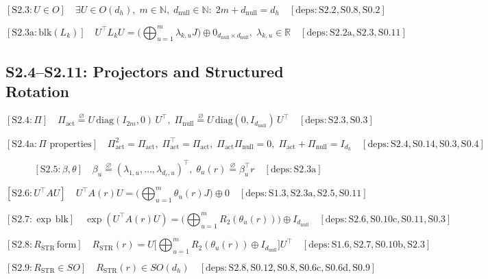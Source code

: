 \documentclass[11pt]{article}
\newcommand{\Nat}{\mathbb{N}}
\newcommand{\Real}{\mathbb{R}}
\newcommand{\eqdef}{\overset{\varnothing}{=}}
\newcommand{\deps}[1]{\quad[\mathrm{deps}:#1]}
\begin{document}
\[
\boxed{[\mathrm{S2}.3:U\in O]}\quad
\exists U\in O(d_h),\; m\in\Nat,\; d_{\mathrm{null}}\in\Nat:\; 2m+d_{\mathrm{null}}=d_h
\deps{\mathrm{S2}.2,\mathrm{S0}.8,\mathrm{S0}.2}
\]

\[
\boxed{[\mathrm{S2}.3\mathrm{a}:\mathrm{blk}(L_k)]}\quad
U^\top L_k U=\Big(\bigoplus_{u=1}^m \lambda_{k,u}J\Big)\oplus 0_{d_{\mathrm{null}}\times d_{\mathrm{null}}},\; \lambda_{k,u}\in\Real
\deps{\mathrm{S2}.2\mathrm{a},\mathrm{S2}.3,\mathrm{S0}.11}
\]

\subsection*{S2.4--S2.11: Projectors and Structured Rotation}

\[
\boxed{[\mathrm{S2}.4:\Pi]}\quad
\Pi_{\mathrm{act}} \eqdef U\,\mathrm{diag}(I_{2m},0)\,U^\top,\;
\Pi_{\mathrm{null}} \eqdef U\,\mathrm{diag}(0,I_{d_{\mathrm{null}}})\,U^\top
\deps{\mathrm{S2}.3,\mathrm{S0}.3}
\]

\[
\boxed{[\mathrm{S2}.4\mathrm{a}:\Pi\text{ properties}]}\quad
\Pi_{\mathrm{act}}^2=\Pi_{\mathrm{act}},\; \Pi_{\mathrm{act}}^\top=\Pi_{\mathrm{act}},\;
\Pi_{\mathrm{act}}\Pi_{\mathrm{null}}=0,\;
\Pi_{\mathrm{act}}+\Pi_{\mathrm{null}}=I_{d_h}
\deps{\mathrm{S2}.4,\mathrm{S0}.14,\mathrm{S0}.3,\mathrm{S0}.4}
\]

\[
\boxed{[\mathrm{S2}.5:\beta,\theta]}\quad
\beta_u \eqdef (\lambda_{1,u},\dots,\lambda_{d_c,u})^\top,\;
\theta_u(r) \eqdef \beta_u^\top r
\deps{\mathrm{S2}.3\mathrm{a}}
\]

\[
\boxed{[\mathrm{S2}.6:U^\top A U]}\quad
U^\top A(r)U=\Big(\bigoplus_{u=1}^m \theta_u(r)J\Big)\oplus 0
\deps{\mathrm{S1}.3,\mathrm{S2}.3\mathrm{a},\mathrm{S2}.5,\mathrm{S0}.11}
\]

\[
\boxed{[\mathrm{S2}.7:\exp\,\mathrm{blk}]}\quad
\exp(U^\top A(r)U)=\Big(\bigoplus_{u=1}^m R_2(\theta_u(r))\Big)\oplus I_{d_{\mathrm{null}}}
\deps{\mathrm{S2}.6,\mathrm{S0}.10\mathrm{c},\mathrm{S0}.11,\mathrm{S0}.3}
\]

\[
\boxed{[\mathrm{S2}.8:R_{\mathrm{STR}}\,\mathrm{form}]}\quad
R_{\mathrm{STR}}(r)=U\Big[\bigoplus_{u=1}^m R_2(\theta_u(r))\oplus I_{d_{\mathrm{null}}}\Big]U^\top
\deps{\mathrm{S1}.6,\mathrm{S2}.7,\mathrm{S0}.10\mathrm{b},\mathrm{S2}.3}
\]

\[
\boxed{[\mathrm{S2}.9:R_{\mathrm{STR}}\in SO]}\quad
R_{\mathrm{STR}}(r)\in SO(d_h)
\deps{\mathrm{S2}.8,\mathrm{S0}.12,\mathrm{S0}.8,\mathrm{S0}.6\mathrm{c},\mathrm{S0}.6\mathrm{d},\mathrm{S0}.9}
\]
\end{document}
